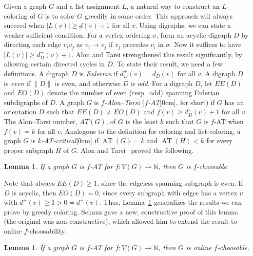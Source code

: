 \documentclass[12pt]{article}
\theoremstyle{plain}
\newtheorem{lem}[thm]{Lemma}
\theoremstyle{definition}
\theoremstyle{remark}
\newcommand{\IN}{\mathbb{N}}
\newcommand{\func}[3]{#1\colon #2 \rightarrow #3}
\newcommand{\AT}{\operatorname{AT}}
\newcommand{\aside}[1]{\marginnote{\scriptsize{#1}}[0cm]}
\begin{document}
Given a graph $G$ and a list assignment $L$, a natural way to construct an
$L$-coloring of $G$ is to color $G$ greedily in some order.  This approach will
always succeed when $|L(v)|\ge d(v)+1$ for all $v$.  Using digraphs, we can
state a weaker sufficient condition.  For a vertex ordering $\sigma$, form an
acyclic digraph $D$ by directing each edge $v_iv_j$ as $v_i \to v_j$ if $v_j$
precedes $v_i$ in $\sigma$.  Now it suffices to have $|L(v)|\ge d^+_D(v)+1$. 
Alon and Tarsi strengthened this result significantly, by
allowing certain directed cycles in $D$.  To state their result, we need a few
definitions.  A digraph $D$ is \emph{Eulerian} if $d^+_D(v)=d^-_D(v)$ for all
$v$.  A digraph $D$ is \emph{even} if $\|D\|$ is even, and otherwise $D$ is
\emph{odd}.  For a digraph $D$, let $EE(D)$ and $EO(D)$ denote the number of
even (resp.~odd) spanning Eulerian subdigraphs of $D$.  A graph $G$ is
\emph{$f$-Alon--Tarsi} (\emph{$f$-AT}\aside{$f$-AT}, for short) if $G$ has an
orientation $D$ such that $EE(D)\ne EO(D)$ and $f(v)\ge d^+_D(v)+1$ for all
$v$.  The Alon--Tarsi number, $AT(G)$, of $G$ is the least $k$ such that $G$ is
$f$-AT when $f(v)=k$ for all $v$.  Analogous to the definition for coloring and
list-coloring, a graph $G$ is \emph{$k$-AT-critical}\aside{$k$-AT-critical} if
$\AT(G)=k$ and $\AT(H)<k$ for every proper subgraph $H$ of $G$.  
Alon and Tarsi~\cite{Alon1992125} proved the following.
 
\begin{lem}\label{AlonTarsi}
If a graph $G$ is $f$-AT for $\func{f}{V(G)}{\IN}$, then $G$ is $f$-choosable.
\end{lem}

Note that always $EE(D)\ge 1$, since the edgeless spanning subgraph is even. 
If $D$ is acyclic, then $EO(D)=0$, since every subgraph with edges has a vertex
$v$ with $d^+(v)\ge 1 > 0 = d^-(v)$.  Thus, Lemma~\ref{AlonTarsi} generalizes the
results we can prove by greedy coloring.  Schauz \cite{schauz2010flexible} gave
a new, constructive proof of this lemma (the original was non-constructive),
which allowed him to extend the result to online $f$-choosability.

\begin{lem}\label{Schauz}
If a graph $G$ is $f$-AT for $\func{f}{V(G)}{\IN}$, then $G$ is online $f$-choosable.
\end{lem}
\end{document}
